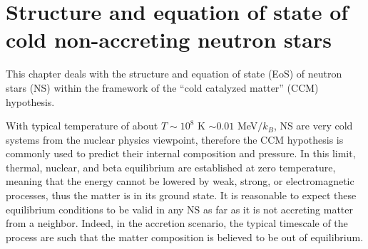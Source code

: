 %

\def\edit{\textcolor{red}}

\chapter{Structure and equation of state of cold non-accreting neutron stars}

This chapter deals with the structure and equation of state (EoS) of neutron 
stars (NS) within the framework of the ``cold catalyzed matter'' 
(CCM) hypothesis.

With typical temperature of about $T \sim 10^8$ K $\sim 0.01$ MeV$/k_B$, NS are 
very cold systems from the nuclear physics viewpoint, therefore the CCM hypothesis 
is commonly used to predict their internal composition and pressure. In this 
limit, thermal, nuclear, and beta equilibrium are established at zero
temperature, meaning that the energy cannot be lowered by weak, strong, or 
electromagnetic processes, thus the matter is in its ground state. It is 
reasonable to expect these equilibrium conditions to be valid in any NS as far 
as it is not accreting matter from a neighbor. Indeed, in the accretion 
scenario, the typical timescale of the process are such that the matter
composition is believed to be out of equilibrium.

